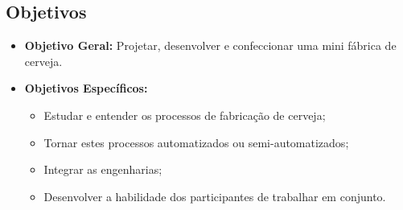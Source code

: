     \subsection{Objetivos}

    \begin{itemize}
        \item \textbf{Objetivo Geral:} Projetar, desenvolver e confeccionar uma mini fábrica de cerveja.
        \item \textbf{Objetivos Específicos:}
        \begin{itemize}
            \item Estudar e entender os processos de fabricação de cerveja;
            \item Tornar estes processos automatizados ou semi-automatizados;
            \item Integrar as engenharias;
            \item Desenvolver a habilidade dos participantes de trabalhar em conjunto.
        \end{itemize}
    \end{itemize}
